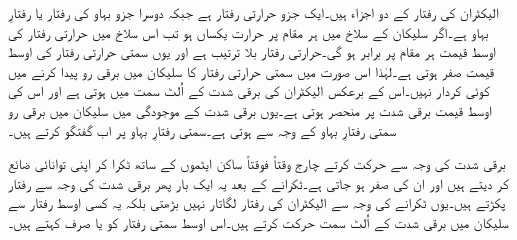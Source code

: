 الیکٹران کی رفتار کے دو اجزاء ہیں۔ایک جزو حرارتی رفتار ہے جبکہ دوسرا جزو بہاو کی رفتار یا رفتارِ بہاو ہے۔اگر سلیکان کے سلاخ میں ہر مقام پر حرارت یکساں ہو تب اس سلاخ میں حرارتی رفتار کی اوسط قیمت ہر مقام پر برابر ہو گی۔حرارتی رفتار بلا ترتیب ہے اور یوں سمتی حرارتی رفتار کی اوسط قیمت صفر ہوتی ہے۔لہٰذا اس صورت میں سمتی حرارتی رفتار کا سلیکان میں برقی رو پیدا کرنے میں کوئی کردار نہیں۔اس کے برعکس الیکٹران کی   برقی شدت کے اُلٹ سمت میں ہوتی ہے اور اس کی اوسط قیمت برقی شدت پر منحصر ہوتی ہے۔یوں برقی شدت کے موجودگی میں سلیکان میں برقی رو سمتی رفتارِ بہاو کے وجہ سے ہوتی ہے۔سمتی رفتارِ بہاو پر اب گفتگو کرتے ہیں۔

برقی شدت کی وجہ سے حرکت کرتے چارج وقتاً فوقتاً ساکن ایٹموں کے ساتھ ٹکرا کر اپنی توانائی ضائع کر دیتے ہیں اور ان کی   صفر ہو جاتی ہے۔ٹکرانے کے بعد یہ ایک بار پھر برقی شدت کی وجہ سے رفتار پکڑتے ہیں۔یوں ٹکرانے کی وجہ سے الیکٹران کی رفتار لگاتار نہیں بڑھتی بلکہ یہ کسی اوسط رفتار سے سلیکان میں برقی شدت کے اُلٹ سمت حرکت کرتے ہیں۔اس اوسط سمتی رفتار کو   یا صرف  کہتے ہیں۔ 

